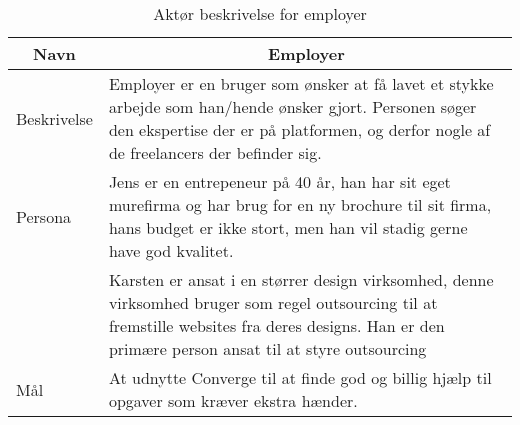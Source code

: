 \begin{table}[H]
    \begin{small}
        \caption{Aktør beskrivelse for employer}
        \label{tab:employer}
        \begin{center}
            \begin{tabular}[c]{l|l}
                \multicolumn{1}{c|}{\textbf{Navn}} & \multicolumn{1}{c}{\textbf{Employer}}                                                                                                                                                                                           \\
                \hline
                Beskrivelse                        & \multicolumn{1}{p{10cm}}{Employer er en bruger som ønsker at få lavet et stykke arbejde som han/hende ønsker gjort. Personen søger den ekspertise der er på platformen, og derfor nogle af de freelancers der befinder sig.}    \\
                \hline
                Persona                            & \multicolumn{1}{p{10cm}}{Jens er en entrepeneur på 40 år, han har sit eget murefirma og har brug for en ny brochure til sit firma, hans budget er ikke stort, men han vil stadig gerne have god kvalitet.}                      \\
                                                   & \multicolumn{1}{p{10cm}}{Karsten er ansat i en størrer design virksomhed, denne virksomhed bruger som regel outsourcing til at fremstille websites fra deres designs. Han er den primære person ansat til at styre outsourcing} \\
                \hline
                Mål                                & \multicolumn{1}{p{10cm}}{At udnytte Converge til at finde god og billig hjælp til opgaver som kræver ekstra hænder.}                                                                                                            \\
            \end{tabular}
        \end{center}
    \end{small}
\end{table}

